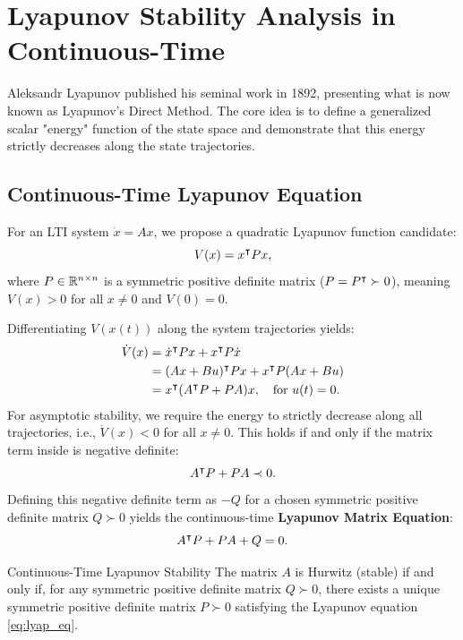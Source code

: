 \section{Lyapunov Stability Analysis in Continuous-Time}
Aleksandr Lyapunov published his seminal work in 1892, presenting what is now known as Lyapunov's Direct Method. The core idea is to define a generalized scalar "energy" function of the state space and demonstrate that this energy strictly decreases along the state trajectories.

\subsection{Continuous-Time Lyapunov Equation}
For an LTI system $\dot{x} = Ax$, we propose a quadratic Lyapunov function candidate:
\begin{equation}
    V(x) = x^\intercal P x , \label{eq:lyap_candidate}
\end{equation}
where $P \in \mathbb{R}^{n \times n}$ is a symmetric positive definite matrix ($P = P^\intercal \succ 0$), meaning $V(x) > 0$ for all $x \neq 0$ and $V(0) = 0$.

Differentiating $V(x(t))$ along the system trajectories yields:
\begin{align}
    \dot{V}(x) &= \dot{x}^\intercal P x + x^\intercal P \dot{x} \nonumber \\
    &= (Ax + Bu)^\intercal P x + x^\intercal P (Ax + Bu) \nonumber \\
&= x^\intercal (A^\intercal P + P A) x, \quad \text{for } u(t) = 0 .
\end{align}
For asymptotic stability, we require the energy to strictly decrease along all trajectories, i.e., $\dot{V}(x) < 0$ for all $x \neq 0$. This holds if and only if the matrix term inside is negative definite:
\begin{equation}
A^\intercal P + P A \prec 0 .
\end{equation}
Defining this negative definite term as $-Q$ for a chosen symmetric positive definite matrix $Q \succ 0$ yields the continuous-time \textbf{Lyapunov Matrix Equation}:
\begin{equation}
    A^\intercal P + P A + Q = 0 . \label{eq:lyap_eq}
\end{equation}

\begin{mytheorem}{Continuous-Time Lyapunov Stability}
The matrix $A$ is Hurwitz (stable) if and only if, for any symmetric positive definite matrix $Q \succ 0$, there exists a unique symmetric positive definite matrix $P \succ 0$ satisfying the Lyapunov equation \eqref{eq:lyap_eq}.
\end{mytheorem}

